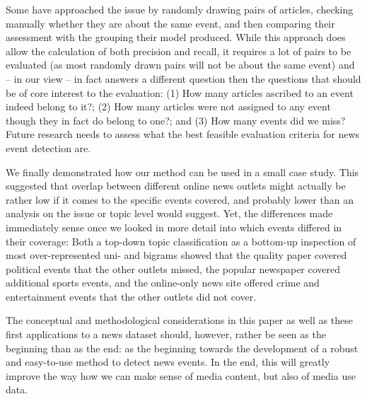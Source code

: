 \documentclass[a4paper,man,natbib,floatsintext,mask]{apa6}
\begin{document}
Some \citep{Welbers2016,Nicholls2018} have approached the issue by randomly drawing pairs of articles, checking manually whether they are about the same event, and then comparing their assessment with the grouping their model produced. While this approach does allow the calculation of both precision and recall, it requires a lot of pairs to be evaluated (as most randomly drawn pairs will not be about the same event) and -- in our view -- in fact answers a different question then the questions that should be of core interest to the evaluation: (1) How many articles ascribed to an event indeed belong to it?; (2) How many articles were not assigned to any event though they in fact do belong to one?; and (3) How many events did we miss?
Future research needs to assess what the best feasible evaluation criteria for news event detection are.

We finally demonstrated how our method can be used in a small case study. This suggested that overlap between different online news outlets might actually be rather low if it comes to the specific events covered, and probably lower than an analysis on the issue or topic level would suggest. Yet, the differences made immediately sense once we looked in more detail into which events differed in their coverage: Both a top-down topic classification as a bottom-up inspection of most over-represented uni- and bigrams showed that the quality paper covered political events that the other outlets missed, the popular newspaper covered additional sports events, and the online-only news site offered crime and entertainment events that the other outlets did not cover.

The conceptual and methodological considerations in this paper as well as these first applications to a news dataset should, however, rather be seen as the beginning than as the end: as the beginning towards the development of a robust and easy-to-use method to detect news events. In the end, this will greatly improve the way how we can make sense of media content, but also of media use data.





\end{document}

